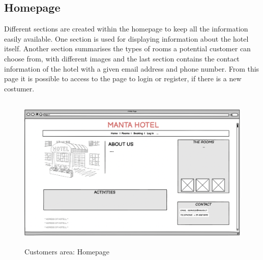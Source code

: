 \subsection{Homepage}
Different sections are created within the homepage to keep all the information easily available. One section is used for displaying information about the hotel itself. Another section summarises the types of rooms a potential customer can choose from, with different images and the last section contains the contact information of the hotel with a given email address and phone number. From this page it is possible to access to the page to login or register, if there is a new costumer.
\begin{figure}[H]
	\centering
	\includegraphics[height=7.5cm]{images/homepage_main.png} 
	\caption{Customers area: Homepage}
\end{figure}